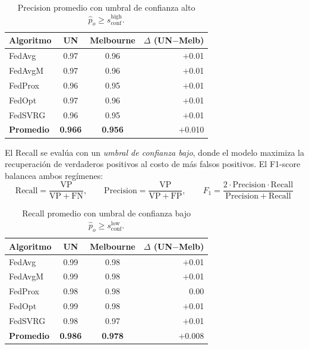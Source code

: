 \medskip
\begin{table}[H]
  \centering
  \caption{Precision promedio con umbral de confianza alto $\hat{p}_o \ge s_{\text{conf}}^{\text{high}}$.}
  \small
  \begin{tabular}{lccr}
    \toprule
    \textbf{Algoritmo} & \textbf{UN} & \textbf{Melbourne} & $\Delta$ \textbf{(UN$-$Melb)} \\
    \midrule
    FedAvg  & 0.97 & 0.96 & $+$0.01 \\
    FedAvgM & 0.97 & 0.96 & $+$0.01 \\
    FedProx & 0.96 & 0.95 & $+$0.01 \\
    FedOpt  & 0.97 & 0.96 & $+$0.01 \\
    FedSVRG & 0.96 & 0.95 & $+$0.01 \\
    \midrule
    \textbf{Promedio} & \textbf{0.966} & \textbf{0.956} & $+$0.010 \\
    \bottomrule
  \end{tabular}
\end{table}

El Recall se evalúa con un \emph{umbral de confianza bajo}, donde el modelo maximiza
la recuperación de verdaderos positivos al costo de más falsos positivos.
El F1-score balancea ambos regímenes:
\[
  \mathrm{Recall} = \frac{\mathrm{VP}}{\mathrm{VP}+\mathrm{FN}},\qquad
  \mathrm{Precision} = \frac{\mathrm{VP}}{\mathrm{VP}+\mathrm{FP}},\qquad
  F_1 = \frac{2\cdot\mathrm{Precision}\cdot\mathrm{Recall}}{\mathrm{Precision}+\mathrm{Recall}}
\]

\medskip
\begin{table}[H]
  \centering
  \caption{Recall promedio con umbral de confianza bajo $\hat{p}_o \ge s_{\text{conf}}^{\text{low}}$.}
  \small
  \begin{tabular}{lccr}
    \toprule
    \textbf{Algoritmo} & \textbf{UN} & \textbf{Melbourne} & $\Delta$ \textbf{(UN$-$Melb)} \\
    \midrule
    FedAvg  & 0.99 & 0.98 & $+$0.01 \\
    FedAvgM & 0.99 & 0.98 & $+$0.01 \\
    FedProx & 0.98 & 0.98 & $\phantom{+}$0.00 \\
    FedOpt  & 0.99 & 0.98 & $+$0.01 \\
    FedSVRG & 0.98 & 0.97 & $+$0.01 \\
    \midrule
    \textbf{Promedio} & \textbf{0.986} & \textbf{0.978} & $+$0.008 \\
    \bottomrule
  \end{tabular}
\end{table}

